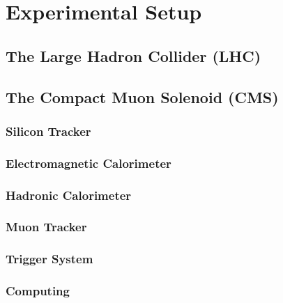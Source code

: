 \chapter{Experimental Setup}
\label{chap::ExperimentalSetup}

\section{The Large Hadron Collider (LHC)}
\section{The Compact Muon Solenoid (CMS)}
\subsection{Silicon Tracker}
\subsection{Electromagnetic Calorimeter}
\subsection{Hadronic Calorimeter}
\subsection{Muon Tracker}
\subsection{Trigger System}
\subsection{Computing}